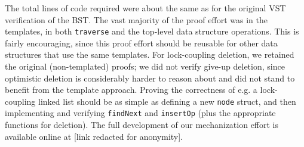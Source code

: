 \documentclass[sigplan,10pt,anonymous,review]{acmart}\settopmatter{printfolios=true,printccs=false,printacmref=false}
\begin{document}
The total lines of code required were about the same as for the original VST verification of the BST. The vast majority of the proof effort was in the templates, in both \lstinline{traverse} and the top-level data structure operations. This is fairly encouraging, since this proof effort should be reusable for other data structures that use the same templates. For lock-coupling deletion, we retained the original (non-templated) proofs; we did not verify give-up deletion, since optimistic deletion is considerably harder to reason about and did not stand to benefit from the template approach.
Proving the correctness of e.g. a lock-coupling linked list should be as simple as defining a new \lstinline{node} struct, and then implementing and verifying \lstinline{findNext} and \lstinline{insertOp} (plus the appropriate functions for deletion).
The full development of our mechanization effort is available online at [link redacted for anonymity].
\end{document}

